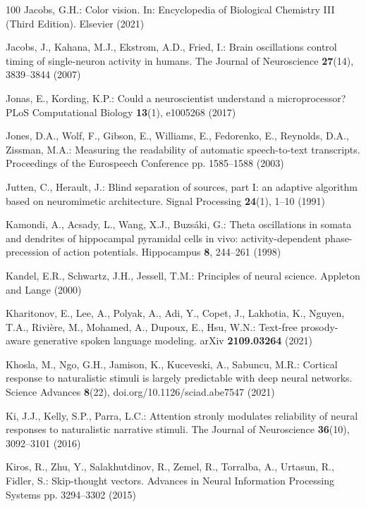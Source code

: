 \documentclass{llmxive}
\begin{document}
\begin{thebibliography}{100}
Jacobs, G.H.: Color vision. In: Encyclopedia of Biological Chemistry {III}
  {({Third} Edition}). Elsevier (2021)

Jacobs, J., Kahana, M.J., Ekstrom, A.D., Fried, I.: Brain oscillations control
  timing of single-neuron activity in humans. The Journal of Neuroscience
  \textbf{27}(14),  3839--3844 (2007)

Jonas, E., Kording, K.P.: Could a neuroscientist understand a microprocessor?
  {PLoS} Computational Biology  \textbf{13}(1),  e1005268 (2017)

Jones, D.A., Wolf, F., Gibson, E., Williams, E., Fedorenko, E., Reynolds, D.A.,
  Zissman, M.A.: Measuring the readability of automatic speech-to-text
  transcripts. Proceedings of the Eurospeech Conference pp. 1585--1588 (2003)

Jutten, C., Herault, J.: Blind separation of sources, part {I}: an adaptive
  algorithm based on neuromimetic architecture. Signal Processing
  \textbf{24}(1),  1--10 (1991)

Kamondi, A., Acsady, L., Wang, X.J., Buzs\'aki, G.: Theta oscillations in
  somata and dendrites of hippocampal pyramidal cells in vivo:
  activity-dependent phase-precession of action potentials. Hippocampus
  \textbf{8},  244--261 (1998)

Kandel, E.R., Schwartz, J.H., Jessell, T.M.: Principles of neural science.
  Appleton and Lange (2000)

Kharitonov, E., Lee, A., Polyak, A., Adi, Y., Copet, J., Lakhotia, K., Nguyen,
  T.A., Rivi{\`e}re, M., Mohamed, A., Dupoux, E., Hsu, W.N.: Text-free
  prosody-aware generative spoken language modeling. {arXiv}
  \textbf{2109.03264} (2021)

Khosla, M., Ngo, G.H., Jamison, K., Kuceveski, A., Sabuncu, M.R.: Cortical
  response to naturalistic stimuli is largely predictable with deep neural
  networks. Science Advances  \textbf{8}(22),  doi.org/10.1126/sciad.abe7547
  (2021)

Ki, J.J., Kelly, S.P., Parra, L.C.: Attention stronly modulates reliability of
  neural responses to naturalistic narrative stimuli. The Journal of
  Neuroscience  \textbf{36}(10),  3092--3101 (2016)

Kiros, R., Zhu, Y., Salakhutdinov, R., Zemel, R., Torralba, A., Urtasun, R.,
  Fidler, S.: Skip-thought vectors. Advances in Neural Information Processing
  Systems pp. 3294--3302 (2015)


\end{thebibliography}
\end{document}
